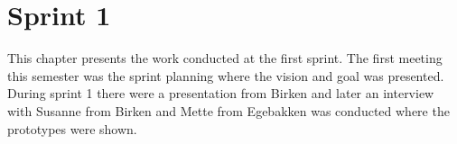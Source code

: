 \chapter{Sprint 1}
This chapter presents the work conducted at the first sprint.
The first meeting this semester was the sprint planning where the vision and goal was presented.
During sprint 1 there were a presentation from Birken and later an interview with Susanne from Birken and Mette from Egebakken was conducted where the prototypes were shown. 


